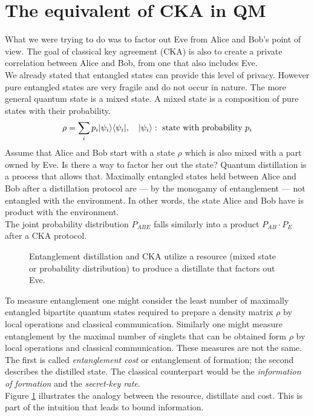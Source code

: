 	
    
\section{The equivalent of CKA in QM}
	What we were trying to do was to factor out Eve from Alice and Bob's point of view.
	The goal of classical key agreement (CKA) is also to create a private correlation between Alice and Bob, from one that also includes Eve.\\
	We already stated that entangled states can provide this level of privacy.
	However pure entangled states are very fragile and do not occur in nature.
	The more general quantum state is a mixed state.
	A mixed state is a composition of pure states with their probability.
	\begin{equation}
		\rho = \sum_i p_i |\psi_i \rangle\langle \psi_i| ,\quad |\psi_i \rangle: \text{ state with probability } p_i
	\end{equation}
	Assume that Alice and Bob start with a state $\rho$ which is also mixed with a part owned by Eve. 
	Is there a way to factor her out the state?
	Quantum distillation is a process that allows that. \label{distillation}
	Maximally entangled states held between Alice and Bob after a distillation protocol are --- by the monogamy of entanglement --- not entangled with the environment. 
	In other words, the state Alice and Bob have is product with the environment.\\
	The joint probability distribution $P_{ABE}$ falls similarly into a product $P_{AB}\cdot P_E$ after a CKA protocol.\\
    
    \begin{figure}[h]
    	\centering
    	
    	\caption{Entanglement distillation and CKA utilize a resource (mixed state or probability distribution) to produce a distillate that factors out Eve.}
    	\label{Fig:intuition}
    \end{figure}
    
    To measure entanglement one might consider the least number of maximally entangled bipartite quantum states required to prepare a density matrix $\rho$ by local operations and classical communication. 
    Similarly one might measure entanglement by the maximal number of singlets that can be obtained form $\rho$ by local operations and classical communication. 
    These measures are not the same. 
    The first is called \emph{entanglement cost} or entanglement of formation; the second describes the distilled state. 
    The classical counterpart would be the \emph{information of formation} and the \emph{secret-key rate}.\\
    Figure \ref{Fig:intuition} illustrates the analogy between the resource, distillate and cost.
    This is part of the intuition that leads to bound information.
    
    